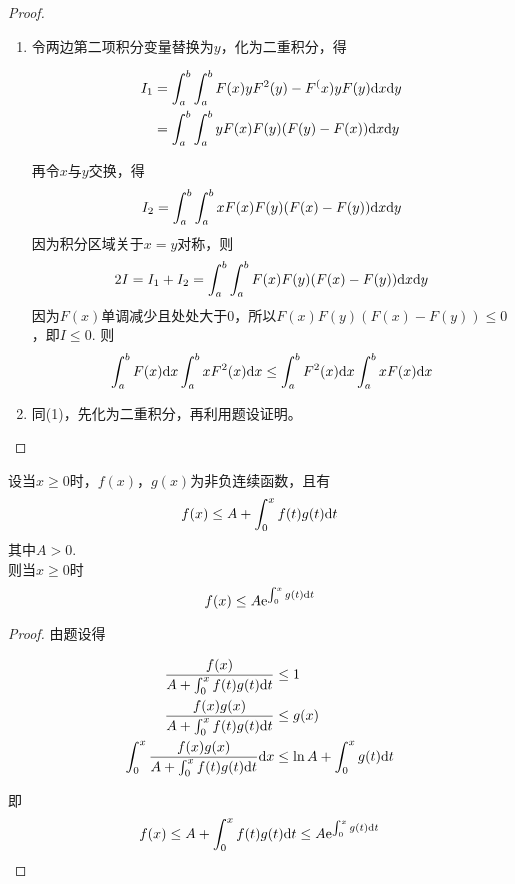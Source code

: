 \begin{proof}
    
    \begin{enumerate}

        \item
            令两边第二项积分变量替换为$y$，化为二重积分，得
        
            \begin{align*}
                I_1 & = \int_{a}^{b}{\int_{a}^{b}{F(x)yF^2(y) - F^(x)yF(y)}\mathrm{d} x}\mathrm{d} y \\
                & = \int_{a}^{b}{\int_{a}^{b}{yF(x)F(y)(F(y) - F(x))}\mathrm{d} x}\mathrm{d} y
            \end{align*}

            再令$x$与$y$交换，得
            $$I_2 = \int_{a}^{b}{\int_{a}^{b}{xF(x)F(y)(F(x) - F(y))}\mathrm{d} x}\mathrm{d} y$$
            因为积分区域关于$x = y$对称，则
            $$2I = I_1 + I_2 = \int_{a}^{b}{\int_{a}^{b}{F(x)F(y)(F(x) - F(y))}\mathrm{d} x}\mathrm{d} y$$
            因为$F(x)$单调减少且处处大于$0$，所以$F(x)F(y)(F(x) - F(y)) \leq 0$，即$I \leq 0$.
            则
            $$ \int_{a}^{b}{F(x)}\mathrm{d} x\int_{a}^{b}{xF^2(x)}\mathrm{d} x \leq \int_{a}^{b}{F^2(x)}\mathrm{d} x \int_{a}^{b}{xF(x)}\mathrm{d} x $$

        \item 同\textup{(1)}，先化为二重积分，再利用题设证明。
        
    \end{enumerate}

\end{proof}

\begin{theorem}

    设当$x \geq 0$时，$f(x)$，$g(x)$为非负连续函数，且有
    $$f(x) \leq A + \int_{0}^{x}{f(t)g(t)}\mathrm{d} t$$
    其中$A > 0$. \\
    则当$x \geq 0$时
    $$ f(x) \leq A \mathrm{e}^{\int_{0}^{x}{g(t)}\mathrm{d} t} $$

\end{theorem}

\begin{proof}

    由题设得

    \begin{align*}
        \dfrac{f(x)}{A + \int_{0}^{x}{f(t)g(t)}\mathrm{d} t} & \leq 1 \\
        \dfrac{f(x)g(x)}{A + \int_{0}^{x}{f(t)g(t)}\mathrm{d} t} & \leq g(x) \\
        \int_{0}^{x}{\dfrac{f(x)g(x)}{A + \int_{0}^{x}{f(t)g(t)}\mathrm{d} t}}\mathrm{d} x & \leq \ln A + \int_{0}^{x}{g(t)}\mathrm{d} t
    \end{align*}

    即
    $$f(x)\leq A+\int_{0}^{x}{f(t)g(t)}\mathrm{d} t \leq A \mathrm{e}^{\int_{0}^{x}{g(t)}\mathrm{d} t} $$

\end{proof}


